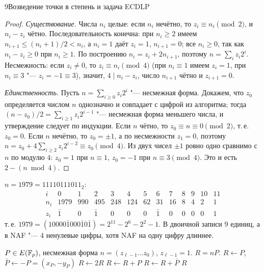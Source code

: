 \begin{lecture}{9}{Возведение точки в степень и задача ECDLP}
\begin{proof}
\emph{Существование.} Числа $n_i$ целые: если $n_i$ нечётно, то $z_i \equiv n_i \pmod 2$, и
$n_i - z_i$ чётно. Последовательность конечна: при $n_i \ge 2$ имеем
$n_{i+1} \le (n_i + 1)/2 < n_i$, а $n_i = 1$ даёт $z_i = 1$, $n_{i+1} = 0$; все $n_i \ge 0$, так
как $n_i - z_i \ge 0$ при $n_i \ge 1$. По построению $n_i = z_i + 2n_{i+1}$, поэтому
$n = \sum_i z_i 2^i$. Несмежность: если $z_i \ne 0$, то $z_i \equiv n_i \pmod 4$
(при $n_i \equiv 1$ имеем $z_i = 1$, при $n_i \equiv 3$ "--- $z_i = -1 \equiv 3$), значит,
$4 \mid n_i - z_i$, число $n_{i+1}$ чётно и $z_{i+1} = 0$.

\emph{Единственность.} Пусть $n = \sum_{i \ge 0} z_i 2^i$ "--- несмежная форма. Докажем, что
$z_0$ определяется числом $n$ однозначно и совпадает с цифрой из алгоритма; тогда
$(n - z_0)/2 = \sum_{i \ge 1} z_i 2^{i-1}$ "--- несмежная форма меньшего числа, и
утверждение следует по индукции. Если $n$ чётно, то $z_0 \equiv n \equiv 0 \pmod 2$, т.\,е.
$z_0 = 0$. Если $n$ нечётно, то $z_0 = \pm 1$, а по несмежности $z_1 = 0$, поэтому
$n = z_0 + 4\sum_{i \ge 2} z_i 2^{i-2} \equiv z_0 \pmod 4$. Из двух чисел $\pm 1$ ровно одно
сравнимо с $n$ по модулю $4$: $z_0 = 1$ при $n \equiv 1$, $z_0 = -1$ при $n \equiv 3 \pmod 4$.
Это и есть $2 - (n \bmod 4)$.
\end{proof}

\begin{example}\label{l9:ex-naf}
$n = 1979 = 11110111011_2$:
\[
\begin{array}{c|rrrrrrrrrrrr}
  i   & 0 & 1 & 2 & 3 & 4 & 5 & 6 & 7 & 8 & 9 & 10 & 11 \\ \hline
  n_i & 1979 & 990 & 495 & 248 & 124 & 62 & 31 & 16 & 8 & 4 & 2 & 1 \\
  z_i & \bar 1 & 0 & \bar 1 & 0 & 0 & 0 & \bar 1 & 0 & 0 & 0 & 0 & 1
\end{array}
\]
т.\,е. $1979 = (10000\bar 1 000\bar 1 0\bar 1) = 2^{11} - 2^6 - 2^2 - 1$. В двоичной записи
$9$ единиц, а в NAF "--- $4$ ненулевые цифры, хотя NAF на одну цифру длиннее.
\end{example}


\begin{algorithm}\label{l9:alg-naf}\leavevmode
\begin{algorithmic}[1]
\Require $P \in E(\mathbb{F}_p)$, несмежная форма $n = (z_{\ell-1} \dots z_0)$, $z_{\ell-1} = 1$.
\Ensure $R = nP$.
\State $R \gets P$, \quad $\bar P \gets -P = (x_P, -y_P)$
  \State $R \gets 2R$
   \State $R \gets R + P$ \EndIf
   \State $R \gets R + \bar P$ \EndIf
\EndFor
\State \Return $R$
\end{algorithmic}
\end{algorithm}


\end{lecture}

